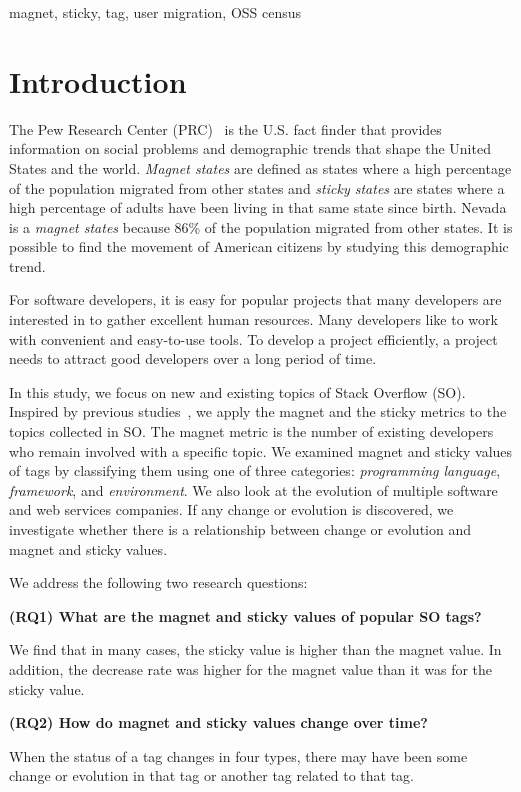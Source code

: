 \documentclass[conference]{IEEEtran}
\begin{document}
\begin{IEEEkeywords}
magnet, sticky, tag, user migration, OSS census
\end{IEEEkeywords}

\section{Introduction}
The Pew Research Center (PRC)~\cite{communityeconomic} is the U.S. fact finder that provides information on social problems and demographic trends that shape the United States and the world.  
\emph{Magnet states} are defined as states where a high percentage of the population migrated from other states and \emph{sticky states} are states where a high percentage of adults have been living in that same state since birth. 
Nevada is a \emph{magnet states} because  86\% of the population migrated from other states. It is possible to find the movement of American citizens by studying this demographic trend.

For software developers, it is easy for popular projects that many developers are interested in to gather excellent human resources. Many developers like to work with convenient and easy-to-use tools. To develop a project efficiently, a project needs to attract good developers over a long period of time.

In this study, we focus on new and existing topics of Stack Overflow (SO). Inspired by previous studies~\cite{yamashita2016magnet}, we apply the magnet and the sticky metrics to the topics collected in SO. 
The magnet metric is the number of existing developers who remain involved with a specific topic.
We examined magnet and sticky values of tags by classifying them using one of three categories: \emph{programming language}, \emph{framework}, and \emph{environment}. We also look at the evolution of multiple software and web services companies. If any change or evolution is discovered, we investigate whether there is a relationship between change or evolution and magnet and sticky values.

We address the following two research questions:

\noindent \textbf{(RQ1) What are the magnet and sticky values of popular SO tags?}\par
We find that in many cases, the sticky value is higher than the magnet value. In addition, the decrease rate was higher for the magnet value than it was for the sticky value.

\noindent \textbf{(RQ2) How do magnet and sticky values change over time?}\par
When the status of a tag changes in four types, there may have been some change or evolution in that tag or another tag related to that tag.
\end{document}
